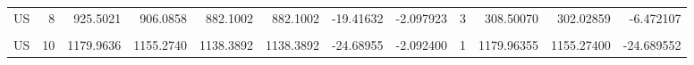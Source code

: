 \begin{table}
\begin{tabular}{lrrrrrrrrrrr}
US & 8 & 925.5021 & 906.0858 & 882.1002 & 882.1002 & -19.41632 & -2.097923 & 3 & 308.50070 & 302.02859 & -6.472107\\
\cellcolor{gray!10}{US} & \cellcolor{gray!10}{9} & \cellcolor{gray!10}{952.2624} & \cellcolor{gray!10}{939.1430} & \cellcolor{gray!10}{912.1560} & \cellcolor{gray!10}{912.1560} & \cellcolor{gray!10}{-13.11936} & \cellcolor{gray!10}{-1.377704} & \cellcolor{gray!10}{2} & \cellcolor{gray!10}{476.13119} & \cellcolor{gray!10}{469.57151} & \cellcolor{gray!10}{-6.559680}\\
US & 10 & 1179.9636 & 1155.2740 & 1138.3892 & 1138.3892 & -24.68955 & -2.092400 & 1 & 1179.96355 & 1155.27400 & -24.689552\\
\bottomrule
\end{tabular}
\end{table}
